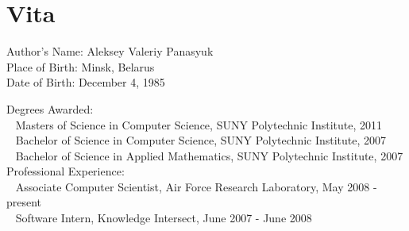 \clearpage
\vspace*{3cm}
\section*{Vita}
\thispagestyle{empty}
Author's Name: \hfill Aleksey Valeriy Panasyuk\\
Place of Birth: \hfill Minsk, Belarus\\
Date of Birth: \hfill December 4, 1985

\noindent Degrees Awarded:\\
\mbox{}~ \hfill Masters of Science in Computer Science, SUNY Polytechnic Institute, 2011\\
\mbox{}~ \hfill Bachelor of Science in Computer Science, SUNY Polytechnic Institute, 2007\\
\mbox{}~ \hfill Bachelor of Science in Applied Mathematics, SUNY Polytechnic Institute, 2007\\


\noindent Professional Experience:\\
{%
\mbox{}~ \hfill Associate Computer Scientist, Air Force Research Laboratory, May 2008 - present\\[0pt]
\mbox{}~ \hfill Software Intern, Knowledge Intersect, June 2007 - June 2008\\[0pt]
}
